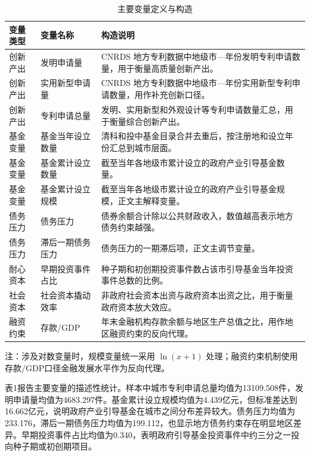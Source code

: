 \begin{table}[htbp]
  \centering
  \caption*{主要变量定义与构造}
  {\ERJTableFont
  \begin{tabularx}{0.96\linewidth}{l l X}
    \toprule
    变量类型 & 变量名称 & 构造说明 \\
    \midrule
    创新产出 & 发明申请量 & CNRDS 地方专利数据中地级市—年份发明专利申请数量，用于衡量高质量创新产出。 \\
    创新产出 & 实用新型申请量 & CNRDS 地方专利数据中地级市—年份实用新型专利申请数量，用作补充创新口径。 \\
    创新产出 & 专利申请总量 & 发明、实用新型和外观设计等专利申请数量汇总，用于衡量综合创新产出。 \\
    基金变量 & 基金当年设立数量 & 清科和投中基金目录合并去重后，按注册地和设立年份汇总到城市层面。 \\
    基金变量 & 基金累计设立数量 & 截至当年各地级市累计设立的政府产业引导基金数量。 \\
    基金变量 & 基金累计设立规模 & 截至当年各地级市累计设立的政府产业引导基金规模，正文主解释变量。 \\
    债务压力 & 债务压力 & 债券余额合计除以公共财政收入，数值越高表示地方债务约束越强。 \\
    债务压力 & 滞后一期债务压力 & 债务压力的一期滞后项，正文主调节变量。 \\
    耐心资本 & 早期投资事件占比 & 种子期和初创期投资事件数占该市引导基金当年投资事件总数的比例。 \\
    社会资本 & 社会资本撬动效率 & 非政府社会资本出资与政府资本出资之比，用于衡量政府资本放大效应。 \\
    融资约束 & 存款/GDP & 年末金融机构存款余额与地区生产总值之比，用作地区融资约束的反向代理。 \\
    \bottomrule
  \end{tabularx}

  \par\smallskip
  {\ERJTableNoteFont 注：涉及对数变量时，规模变量统一采用 $\ln(x+1)$ 处理；融资约束机制使用存款/GDP口径金融发展水平作为反向代理。}
  }
\end{table}

表1报告主要变量的描述性统计。样本中城市专利申请总量均值为13109.508件，发明申请量均值为4683.297件。基金累计设立规模均值为4.439亿元，但标准差达到16.662亿元，说明政府产业引导基金在城市之间分布差异较大。债务压力均值为233.176，滞后一期债务压力均值为199.112，也显示地方债务约束存在明显地区差异。早期投资事件占比均值为0.340，表明政府引导基金投资事件中约三分之一投向种子期或初创期项目。

